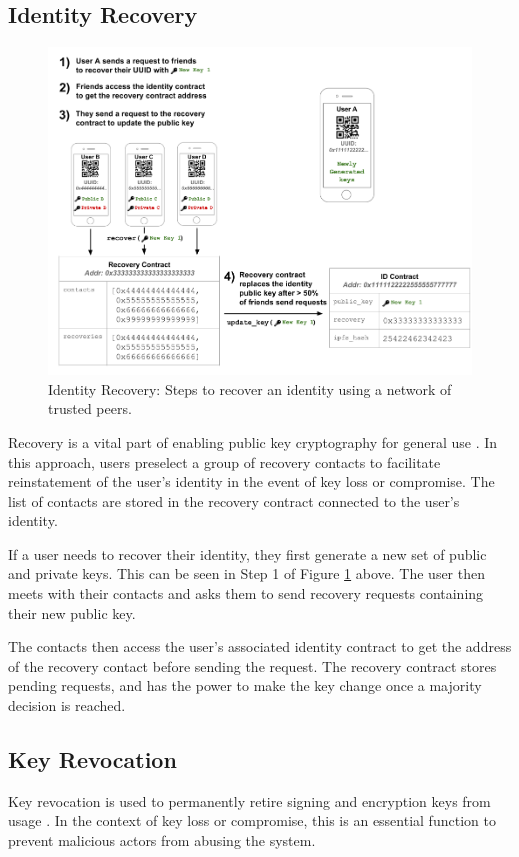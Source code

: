 \subsection{Identity Recovery}
\label{sec:identity-recovery}
\begin{figure}[ht]
\centering
     \includegraphics[width=1.0\textwidth]{./images/DiagramRecovery.png}
      \caption{Identity Recovery: Steps to recover an identity using a network of trusted peers.}
       \label{fig:diagram-recovery}
\end{figure}

Recovery is a vital part of enabling public key cryptography for general use \cite{microsoft_key_nodate}.
In this approach, users preselect a group of recovery contacts to facilitate reinstatement of the user's identity in the event of key loss or compromise. The list of contacts are stored in the recovery contract connected to the user's identity. 

If a user needs to recover their identity, they first generate a new set of public and private keys. This can be seen in Step 1 of Figure \ref{fig:diagram-recovery} above. The user then meets with their contacts and asks them to send recovery requests containing their new public key.

The contacts then access the user's associated identity contract to get the address of the recovery contact before sending the request. The recovery contract stores pending requests, and has the power to make the key change once a majority decision is reached.

\subsection{Key Revocation}
Key revocation is used to permanently retire signing and encryption keys from usage \cite{brooks_key_1995}. In the context of key loss or compromise, this is an essential function to prevent malicious actors from abusing the system.

